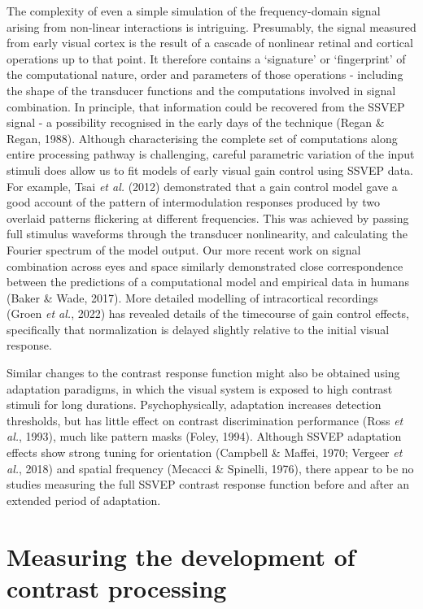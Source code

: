 \documentclass[
  letterpaper,
  DIV=11,
  numbers=noendperiod]{scrartcl}
\begin{document}
The complexity of even a simple simulation of the frequency-domain
signal arising from non-linear interactions is intriguing. Presumably,
the signal measured from early visual cortex is the result of a cascade
of nonlinear retinal and cortical operations up to that point. It
therefore contains a `signature' or `fingerprint' of the computational
nature, order and parameters of those operations - including the shape
of the transducer functions and the computations involved in signal
combination. In principle, that information could be recovered from the
SSVEP signal - a possibility recognised in the early days of the
technique (Regan \& Regan, 1988). Although characterising the complete
set of computations along entire processing pathway is challenging,
careful parametric variation of the input stimuli does allow us to fit
models of early visual gain control using SSVEP data. For example, Tsai
\emph{et al.} (2012) demonstrated that a gain control model gave a good
account of the pattern of intermodulation responses produced by two
overlaid patterns flickering at different frequencies. This was achieved
by passing full stimulus waveforms through the transducer nonlinearity,
and calculating the Fourier spectrum of the model output. Our more
recent work on signal combination across eyes and space similarly
demonstrated close correspondence between the predictions of a
computational model and empirical data in humans (Baker \& Wade, 2017).
More detailed modelling of intracortical recordings (Groen \emph{et
al.}, 2022) has revealed details of the timecourse of gain control
effects, specifically that normalization is delayed slightly relative to
the initial visual response.

Similar changes to the contrast response function might also be obtained
using adaptation paradigms, in which the visual system is exposed to
high contrast stimuli for long durations. Psychophysically, adaptation
increases detection thresholds, but has little effect on contrast
discrimination performance (Ross \emph{et al.}, 1993), much like pattern
masks (Foley, 1994). Although SSVEP adaptation effects show strong
tuning for orientation (Campbell \& Maffei, 1970; Vergeer \emph{et al.},
2018) and spatial frequency (Mecacci \& Spinelli, 1976), there appear to
be no studies measuring the full SSVEP contrast response function before
and after an extended period of adaptation.

\section{Measuring the development of contrast
processing}\label{measuring-the-development-of-contrast-processing}
\end{document}
